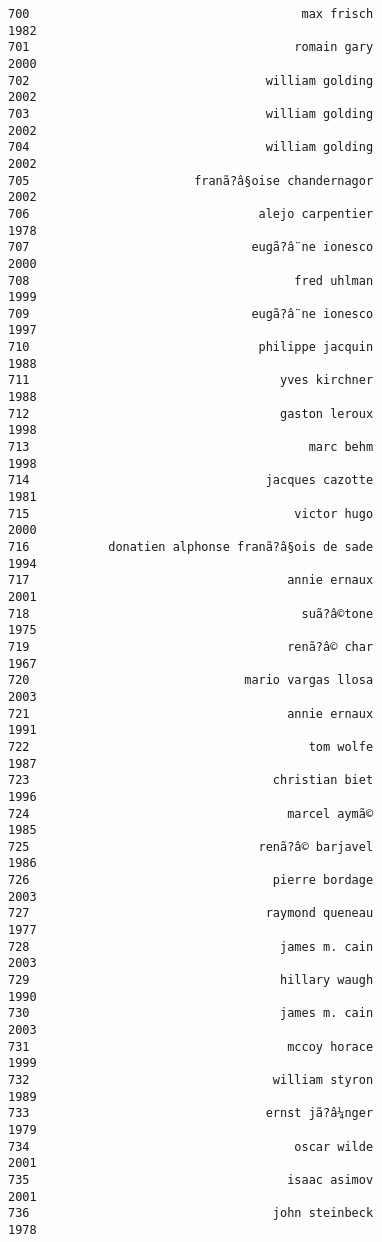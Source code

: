 \documentclass[
]{report}
\begin{document}
\begin{verbatim}
700                                      max frisch                1982
701                                     romain gary                2000
702                                 william golding                2002
703                                 william golding                2002
704                                 william golding                2002
705                       franã?â§oise chandernagor                2002
706                                alejo carpentier                1978
707                               eugã?â¨ne ionesco                2000
708                                     fred uhlman                1999
709                               eugã?â¨ne ionesco                1997
710                                philippe jacquin                1988
711                                   yves kirchner                1988
712                                   gaston leroux                1998
713                                       marc behm                1998
714                                 jacques cazotte                1981
715                                     victor hugo                2000
716           donatien alphonse franã?â§ois de sade                1994
717                                    annie ernaux                2001
718                                      suã?â©tone                1975
719                                    renã?â© char                1967
720                              mario vargas llosa                2003
721                                    annie ernaux                1991
722                                       tom wolfe                1987
723                                  christian biet                1996
724                                    marcel aymã©                1985
725                                renã?â© barjavel                1986
726                                  pierre bordage                2003
727                                 raymond queneau                1977
728                                   james m. cain                2003
729                                   hillary waugh                1990
730                                   james m. cain                2003
731                                    mccoy horace                1999
732                                  william styron                1989
733                                 ernst jã?â¼nger                1979
734                                     oscar wilde                2001
735                                    isaac asimov                2001
736                                  john steinbeck                1978

\end{verbatim}
\end{document}
